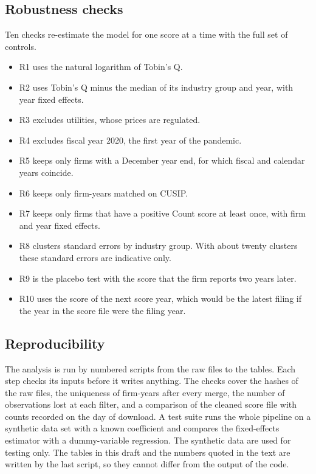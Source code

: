\documentclass[12pt,a4paper]{article}
\begin{document}
\subsection{Robustness checks}

Ten checks re-estimate the model for one score at a time with the full set of controls.

\begin{itemize}
\item R1 uses the natural logarithm of Tobin's Q.
\item R2 uses Tobin's Q minus the median of its industry group and year, with year fixed effects.
\item R3 excludes utilities, whose prices are regulated.
\item R4 excludes fiscal year 2020, the first year of the pandemic.
\item R5 keeps only firms with a December year end, for which fiscal and calendar years coincide.
\item R6 keeps only firm-years matched on CUSIP.
\item R7 keeps only firms that have a positive Count score at least once, with firm and year fixed effects.
\item R8 clusters standard errors by industry group. With about twenty clusters these standard errors are indicative only.
\item R9 is the placebo test with the score that the firm reports two years later.
\item R10 uses the score of the next score year, which would be the latest filing if the year in the score file were the filing year.
\end{itemize}

\subsection{Reproducibility}

The analysis is run by numbered scripts from the raw files to the tables. Each step checks its inputs before it writes anything. The checks cover the hashes of the raw files, the uniqueness of firm-years after every merge, the number of observations lost at each filter, and a comparison of the cleaned score file with counts recorded on the day of download. A test suite runs the whole pipeline on a synthetic data set with a known coefficient and compares the fixed-effects estimator with a dummy-variable regression. The synthetic data are used for testing only. The tables in this draft and the numbers quoted in the text are written by the last script, so they cannot differ from the output of the code.
\end{document}
